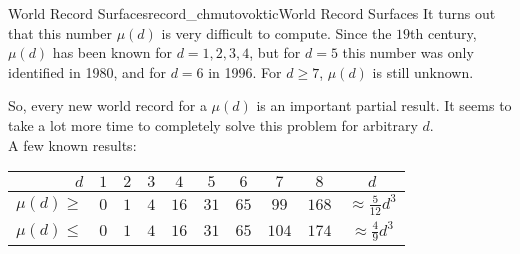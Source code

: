 \begin{surferIntroPage}{World Record Surfaces}{record_chmutovoktic}{World Record Surfaces}
 It turns out that this number $\mu(d)$ is very difficult to compute.
    Since the $19$th century, $\mu(d)$ has been known for $d=1,2,3,4$, but for $d=5$
    this number was only identified in 1980, and for $d=6$ in 1996.
    For $d\ge 7$, $\mu(d)$ is still unknown.
  
    So, every new world record for a $\mu(d)$ is an important partial result. It seems to take a lot more time to completely solve this problem for arbitrary $d$.\\  A few known results:
    
   \begin{center}
      \begin{tabular}{r|cccccccc|c}
        $d$ & $1$ & $2$ & $3$ & $4$ & $5$ & $6$ & $7$ & $8$ & $d$\\
        \hline
        \hline
        \rule{0pt}{1.2em}$\mu(d)\ge$ & $0$ & $1$ & $4$ & $16$ & $31$ & $65$ &
        $99$ & $168$ & 
        $\approx \frac{5}{12}d^3$\\[0.3em]
        \hline
        \rule{0pt}{1.2em}$\mu(d)\le$ & $0$ & $1$ & $4$ & $16$ & $31$ & $65$ &
        $104$ & $174$ & $\approx \frac{4}{9}d^3$
      \end{tabular}
    \end{center}
\end{surferIntroPage}
